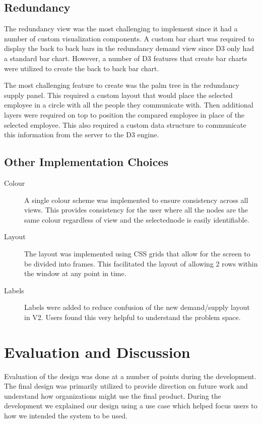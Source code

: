 \documentclass[journal]{vgtc}                %
\begin{document}
\subsection{Redundancy}
The redundancy view was the most challenging to implement since it had a number of custom visualization components.  A custom bar chart was required to display the back to back bars in the redundancy demand view since D3 only had a standard bar chart.  However, a number of D3 features that create bar charts were utilized to create the back to back bar chart.

The most challenging feature to create was the palm tree in the redundancy supply panel.  This required a custom layout that would place the selected employee in a circle with all the people they communicate with.  Then additional layers were required on top to position the compared employee in place of the selected employee.  This also required a custom data structure to communicate this information from the server to the D3 engine.

\subsection{Other Implementation Choices}

\begin{description}
\item [Colour] A single colour scheme was implemented to ensure consistency across all views.  This provides consistency for the user where all the nodes are the same colour regardless of view and the selectednode is easily identifiable.
\item[Layout] The layout was implemented using CSS grids that allow for the screen to be divided into frames.  This facilitated the layout of allowing 2 rows within the window at any point in time.
\item[Labels] Labels were added to reduce confusion of the new demand/supply layout in V2.  Users found this very helpful to understand the problem space.
\end{description}

\section{Evaluation and Discussion}
\label{sec:evaldiscuss}

Evaluation of the design was done at a number of points during the development.  The final design was primarily utilized to provide direction on future work and understand how organizations might use the final product.  During the development we explained our design using a use case which helped focus users to how we intended the system to be used.
\end{document}
